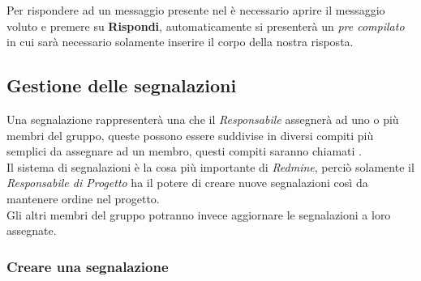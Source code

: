 \documentclass{scalatekids-article}
\begin{document}
Per rispondere ad un messaggio presente nel  è necessario aprire il messaggio voluto e premere su \textbf{Rispondi}, automaticamente si presenterà un  \textit{pre compilato} in cui sarà necessario solamente inserire il corpo della nostra risposta.

\subsection{Gestione delle segnalazioni}

Una segnalazione rappresenterà una  che il \textit{Responsabile} assegnerà ad uno o più membri del gruppo, queste  possono essere suddivise in diversi compiti più semplici da assegnare ad un membro, questi compiti saranno chiamati .\\
Il sistema di segnalazioni è la cosa più importante di \textit{Redmine}, perciò solamente il \textit{Responsabile di Progetto} ha il potere di creare nuove segnalazioni così da mantenere ordine nel progetto. \\Gli altri membri del gruppo potranno invece aggiornare le segnalazioni a loro assegnate.

\subsubsection{Creare una segnalazione}
\end{document}
